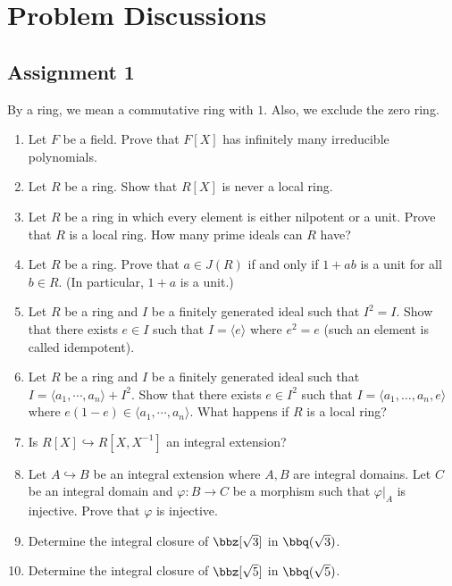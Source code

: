 \chapter{Problem Discussions}

\section{Assignment 1}

\begin{convention}
By a ring, we mean a commutative ring with $1$. Also, we exclude the zero ring.
\end{convention}

\begin{enumerate}[label=\arabic*.]

\item Let $F$ be a field. Prove that $F[X]$ has infinitely many irreducible polynomials.

\item Let $R$ be a ring. Show that $R[X]$ is never a local ring.

\item Let $R$ be a ring in which every element is either nilpotent or a unit. Prove that $R$ is a local ring. How many prime ideals can $R$ have?

\item Let $R$ be a ring. Prove that $a \in J(R)$ if and only if $1+ab$ is a unit for all $b \in R$. (In particular, $1+a$ is a unit.)

\item Let $R$ be a ring and $I$ be a finitely generated ideal such that $I^2=I$. Show that there exists $e \in I$ such that $I = \langle e \rangle$ where $e^2=e$ (such an element is called idempotent).

\item Let $R$ be a ring and $I$ be a finitely generated ideal such that $I = \langle a_1,\cdots,a_n \rangle + I^2$. Show that there exists $e \in I^2$ such that $I = \langle a_1,\ldots,a_n,e\rangle$ where $e(1-e) \in \langle a_1,\cdots,a_n\rangle$. What happens if $R$ is a local ring?

\item Is $R[X] \hookrightarrow R[X,X^{-1}]$ an integral extension?

\item Let $A \hookrightarrow B$ be an integral extension where $A,B$ are integral domains. Let $C$ be an integral domain and $\varphi: B \to C$ be a morphism such that $\varphi|_A$ is injective. Prove that $\varphi$ is injective.

\item Determine the integral closure of $\bbz[\sqrt3]$ in $\bbq(\sqrt3)$.

\item Determine the integral closure of $\bbz[\sqrt5]$ in $\bbq(\sqrt5)$.

\end{enumerate}

